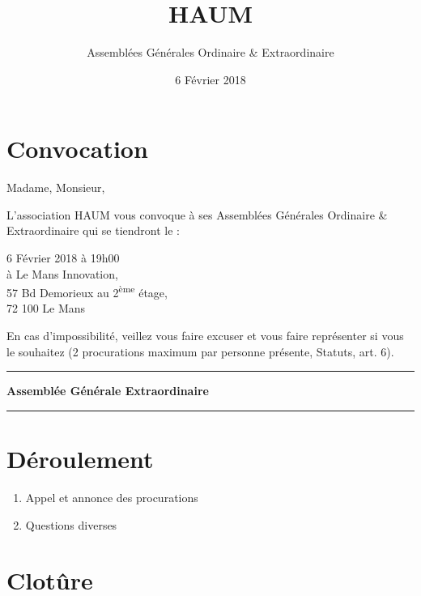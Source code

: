 \documentclass[11pt]{article}
\title{HAUM}
\author{Assemblées Générales Ordinaire \& Extraordinaire}
\date{6 Février 2018}
\begin{document}
\maketitle

\section*{Convocation}

Madame, Monsieur,

L'association HAUM vous convoque à ses Assemblées Générales Ordinaire \& Extraordinaire qui se tiendront le :

\begin{center}
{\Large 6 Février 2018 à 19h00}\\
à Le Mans Innovation,\\57 Bd Demorieux au 2\textsuperscript{ème} étage,\\72 100 Le Mans
\end{center}

En cas d'impossibilité, veillez vous faire excuser et vous faire représenter si vous le souhaitez (2 procurations maximum par personne présente, Statuts, art. 6).

\vspace{1.5cm}

\hrule
\vspace{.3cm}
\begin{center}
\Large\bfseries Assemblée Générale Extraordinaire
\end{center}
\vspace{.3cm}
\hrule

\vspace{1.5cm}

\section*{Déroulement}

\begin{enumerate}
    \item Appel et annonce des procurations
		\item Questions diverses
\end{enumerate}

\section*{Clotûre}

\vspace{1.5cm}
\end{document}
